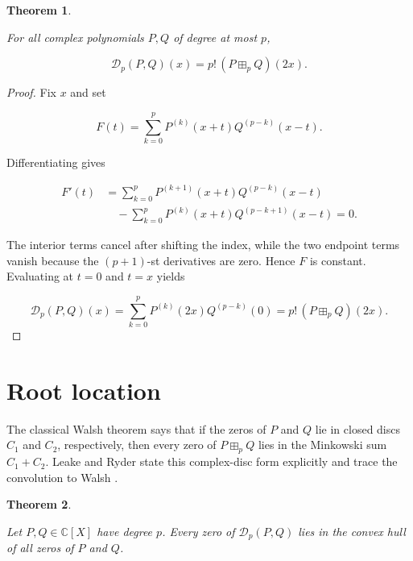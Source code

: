 \documentclass[11pt]{article}
\newtheorem{theorem}{Theorem}
\begin{document}
\Needspace{0.16\textheight}
\begin{theorem}
\label{thm:identity}

For all complex polynomials \(P,Q\) of degree at most \(p\),

\[
\mathcal D_p(P,Q)(x)=p!\,(P\boxplus_pQ)(2x).
\]

\end{theorem}

\begin{proof}

Fix \(x\) and set

\[
F(t)=\sum_{k=0}^{p}P^{(k)}(x+t)Q^{(p-k)}(x-t).
\]

Differentiating gives

\[
\begin{aligned}
F'(t)
&=\sum_{k=0}^{p}P^{(k+1)}(x+t)Q^{(p-k)}(x-t)\\
&\quad-\sum_{k=0}^{p}P^{(k)}(x+t)Q^{(p-k+1)}(x-t)=0.
\end{aligned}
\]

The interior terms cancel after shifting the index, while the two endpoint
terms vanish because the \((p+1)\)-st derivatives are zero. Hence \(F\) is
constant. Evaluating at \(t=0\) and \(t=x\) yields

\[
\mathcal D_p(P,Q)(x)
=\sum_{k=0}^{p}P^{(k)}(2x)Q^{(p-k)}(0)
=p!\,(P\boxplus_pQ)(2x).
\]

\end{proof}

\section{Root location}


The classical Walsh theorem says that if the zeros of \(P\) and \(Q\) lie in
closed discs \(C_1\) and \(C_2\), respectively, then every zero of
\(P\boxplus_pQ\) lies in the Minkowski sum \(C_1+C_2\). Leake and Ryder
\cite[p.~1]{leake-ryder} state this complex-disc form explicitly and trace the convolution
to Walsh \cite{walsh}.

\Needspace{0.16\textheight}
\begin{theorem}
\label{thm:root-location}

Let \(P,Q\in\mathbb C[X]\) have degree \(p\). Every zero of
\(\mathcal D_p(P,Q)\) lies in the convex hull of all zeros of \(P\) and \(Q\).

\end{theorem}
\end{document}
